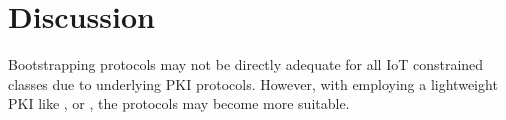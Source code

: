 \chapter{Discussion}
\label{ch:discussion}


Bootstrapping protocols may not be directly adequate for all IoT constrained classes due to underlying PKI protocols. However, with employing a lightweight PKI like \cite{hoglund2020pki4iot}, or \cite{won2018decentralized}, the protocols may become more suitable.
